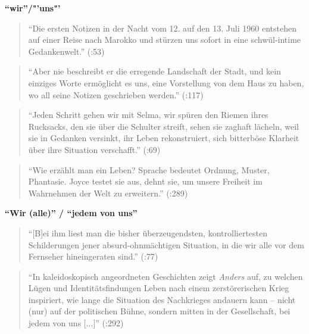 \documentclass[fontsize=12pt]{scrartcl}
\begin{document}
\textbf{"`wir"'/"'uns"'}

\singlespacing
\begin{quote}
"`Die ersten Notizen in der Nacht vom 12. auf den 13. Juli 1960 entstehen auf einer Reise nach Marokko und st\"urzen uns sofort in eine schw\"ul-intime Gedankenwelt."' (\cite{Hartwig2012}:53)
\end{quote}
\onehalfspacing



\singlespacing
\begin{quote}
"`Aber nie beschreibt er die erregende Landschaft der Stadt, und kein einziges Worte erm\"oglicht es uns, eine Vorstellung von dem Haus zu haben, wo all seine Notizen geschrieben werden."' (\cite{Gumbrecht2011}:117)
\end{quote}
\onehalfspacing

\singlespacing
\begin{quote}
"`Jeden Schritt gehen wir mit Selma, wir sp\"uren den Riemen ihres Rucksacks, den sie \"uber die Schulter streift, sehen sie zaghaft l\"acheln, weil sie in Gedanken versinkt, ihr Leben rekonstruiert, sich bitterb\"ose Klarheit \"uber ihre Situation verschafft."' (\cite{Hartwig2012}:69)
\end{quote}
\onehalfspacing

\singlespacing
\begin{quote}
"`Wie erz\"ahlt man ein Leben? Sprache bedeutet Ordnung, Muster, Phantasie. Joyce testet sie aus, dehnt sie, um unsere Freiheit im Wahrnehmen der Welt zu erweitern."' (\cite{Draesner2013}:289)
\end{quote}
\onehalfspacing

\textbf{"`Wir (alle)"' / "`jedem von uns"'}

\singlespacing
\begin{quote}
"`[B]ei ihm liest man die bisher \"uberzeugendsten, kontrolliertesten Schil\-derungen jener absurd-ohnm\"achtigen Situation, in die wir alle vor dem Fernseher hineingeraten sind."' (\cite{Hartwig2012}:77)
\end{quote}
\onehalfspacing

\singlespacing
\begin{quote}
"`In kaleidoskopisch angeordneten Geschichten zeigt \textit{Anders} auf, zu wel\-chen L\"ugen und Identit\"atsfindungen Leben nach einem zerst\"orerischen Krieg \flq inspiriert\frq, wie lange die Situation des Nachkrieges andauern kann -- nicht (nur) auf der politischen B\"uhne, sondern mitten in der Ge\-sell\-schaft, bei jedem von uns [...]"' (\cite{Draesner2013}:292)
\end{quote}
\onehalfspacing
\end{document}

